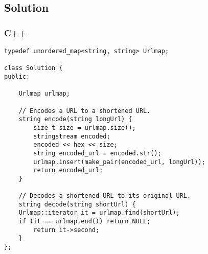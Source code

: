 \newpage

\subsection*{Solution}
\subsubsection*{C++}
\begin{verbatim}
typedef unordered_map<string, string> Urlmap;

class Solution {
public:

    Urlmap urlmap;
    
    // Encodes a URL to a shortened URL.
    string encode(string longUrl) {
        size_t size = urlmap.size();
        stringstream encoded;
        encoded << hex << size;
        string encoded_url = encoded.str();
        urlmap.insert(make_pair(encoded_url, longUrl));
        return encoded_url;
    }
    
    // Decodes a shortened URL to its original URL.
    string decode(string shortUrl) {
    Urlmap::iterator it = urlmap.find(shortUrl);
    if (it == urlmap.end()) return NULL;
        return it->second;
    }
};
\end{verbatim}

\newpage
